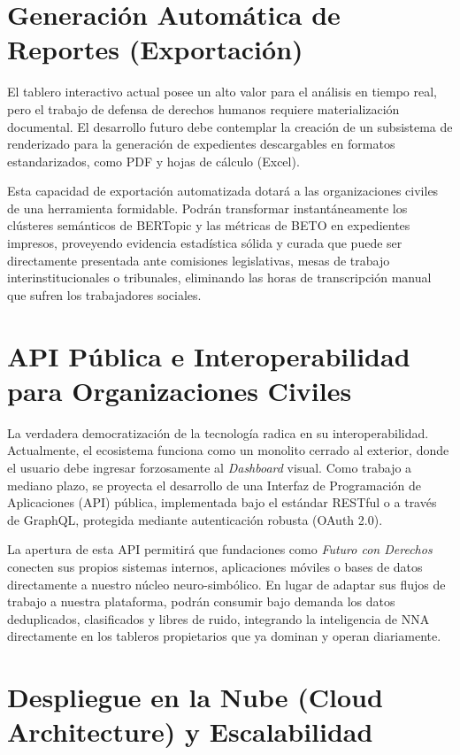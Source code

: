 \section{Generación Automática de Reportes (Exportación)}
\label{sec:tf_reportes}

El tablero interactivo actual posee un alto valor para el análisis en tiempo real, pero el trabajo de defensa de derechos humanos requiere materialización documental. El desarrollo futuro debe contemplar la creación de un subsistema de renderizado para la generación de expedientes descargables en formatos estandarizados, como PDF y hojas de cálculo (Excel). 

Esta capacidad de exportación automatizada dotará a las organizaciones civiles de una herramienta formidable. Podrán transformar instantáneamente los clústeres semánticos de BERTopic y las métricas de BETO en expedientes impresos, proveyendo evidencia estadística sólida y curada que puede ser directamente presentada ante comisiones legislativas, mesas de trabajo interinstitucionales o tribunales, eliminando las horas de transcripción manual que sufren los trabajadores sociales.

\section{API Pública e Interoperabilidad para Organizaciones Civiles}
\label{sec:tf_api}

La verdadera democratización de la tecnología radica en su interoperabilidad. Actualmente, el ecosistema funciona como un monolito cerrado al exterior, donde el usuario debe ingresar forzosamente al \textit{Dashboard} visual. Como trabajo a mediano plazo, se proyecta el desarrollo de una Interfaz de Programación de Aplicaciones (API) pública, implementada bajo el estándar RESTful o a través de GraphQL, protegida mediante autenticación robusta (OAuth 2.0).

La apertura de esta API permitirá que fundaciones como \textit{Futuro con Derechos} conecten sus propios sistemas internos, aplicaciones móviles o bases de datos directamente a nuestro núcleo neuro-simbólico. En lugar de adaptar sus flujos de trabajo a nuestra plataforma, podrán consumir bajo demanda los datos deduplicados, clasificados y libres de ruido, integrando la inteligencia de NNA directamente en los tableros propietarios que ya dominan y operan diariamente.

\section{Despliegue en la Nube (Cloud Architecture) y Escalabilidad}
\label{sec:tf_cloud}

